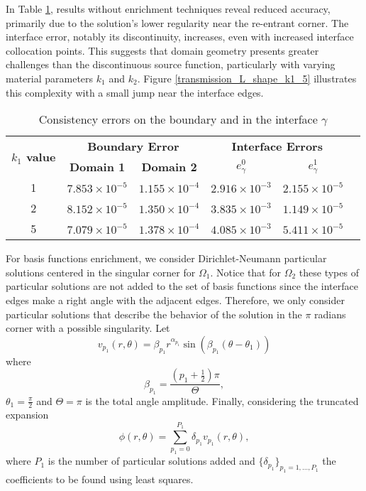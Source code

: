 \documentclass[5p,authoryear]{elsarticle}
\begin{document}
In Table \ref{tab:transmission_results_L_shape_rectangles}, results without enrichment techniques reveal reduced accuracy, primarily due to the solution's lower regularity near the re-entrant corner. The interface error, notably its discontinuity, increases, even with increased interface collocation points. This suggests that domain geometry presents greater challenges than the discontinuous source function, particularly with varying material parameters \(k_1\) and \(k_2\). Figure \ref{transmission_L_shape_k1_5} illustrates this complexity with a small jump near the interface edges.
\begin{table}
    \centering
    \footnotesize %
    \setlength{\tabcolsep}{1pt} %
    \begin{tabular}{@{}cccccc@{}}
      \toprule
      \multirow{2}{*}{\textbf{\(k_1\) value}} & \multicolumn{2}{c}{\textbf{Boundary Error}} & \multicolumn{2}{c}{\textbf{Interface Errors}} \\
      \cmidrule(lr){2-3} \cmidrule(lr){4-5}
      & \textbf{Domain 1} & \textbf{Domain 2} & \textbf{\(e_\gamma^0\)} & \textbf{\(e_\gamma^1\)} & \\
      \midrule
      1 & $7.853\times10^{-5}$ & $1.155\times10^{-4}$ & $2.916\times10^{-3}$ & $2.155\times10^{-5}$ \\
      2 & $8.152\times10^{-5}$ & $1.350\times10^{-4}$ & $3.835\times10^{-3}$ & $1.149\times10^{-5}$\\
      5 & $7.079\times10^{-5}$ & $1.378\times10^{-4}$ & $4.085\times10^{-3}$ & $5.411\times10^{-5}$\\
      \bottomrule
    \end{tabular}
    \caption{Consistency errors on the boundary and in the interface \(\gamma\)}
    \label{tab:transmission_results_L_shape_rectangles}
\end{table}
For basis functions enrichment, we consider Dirichlet-Neumann particular solutions centered in the singular corner for \(\Omega_1\). Notice that for \(\Omega_2\) these types of particular solutions are not added to the set of basis functions since the interface edges make a right angle with the adjacent edges.
Therefore, we only consider particular solutions that describe the behavior of the solution in the \(\pi\) radians corner with a possible singularity. Let
\begin{equation}
    v_{p_1}(r, \theta) = \beta_{p_1} r^{\alpha_{p_1}} \sin(\beta_{p_1}(\theta - \theta_1))
\end{equation}
where
\begin{equation}\label{dir_neumman_betas}
    \beta_{p_1} = \frac{(p_1+\frac{1}{2})\pi}{\Theta},
\end{equation}
\(\theta_1 = \frac{\pi}{2}\) and \(\Theta = \pi\) is the total angle amplitude. Finally, considering the truncated expansion
\begin{equation}\label{num_particular_L_shape_rect_equation}
    \phi(r,\theta)=\sum_{p_1=0}^{P_1} \delta_{p_1} v_{p_1}(r, \theta),
\end{equation}
where \(P_1\) is the number of particular solutions added and \(\{\delta_{p_1}\}_{p_1=1,\dots,P_1}\) the coefficients to be found using least squares.
\end{document}

